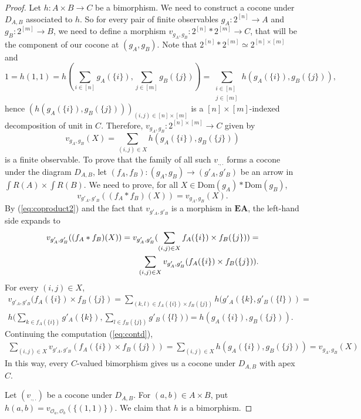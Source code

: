 \documentclass[smallextended]{svjour3}
\begin{document}
\begin{proof}
Let $h:A\times B\to C$ be a bimorphism. 
We need to construct a cocone under $D_{A,B}$ associated to $h$.
So for every pair of finite observables $g_A:2^{[n]}\to A$ and
$g_B:2^{[m]}\to B$, we need to define a morphism $v_{g_A,g_B}:2^{[n]}*2^{[m]}\to C$, that will be
the component of our cocone at $(g_A,g_B)$. Note that $2^{[n]}*2^{[m]}\simeq 2^{[n]\times[m]}$ and
$$
1=h(1,1)=h(\sum_{i\in[n]}g_A(\{i\}),\sum_{j\in[m]}g_B(\{j\}))=
\sum_{\substack{i\in[n]\\j\in[m]}}h(g_A(\{i\}),g_B(\{j\})),
$$
hence $(h(g_A(\{i\}),g_B(\{j\})))_{(i,j)\in[n]\times[m]}$ is a
$[n]\times[m]$-indexed decomposition of unit in $C$.
Therefore, $v_{g_A,g_B}:2^{[n]\times[m]}\to C$ given by
$$
v_{g_A,g_B}(X)=\sum_{(i,j)\in X}h(g_A(\{i\}),g_B(\{j\}))
$$
is a finite observable. To prove that the family of all such $v_{.,.}$ forms a cocone under
the diagram $D_{A,B}$, let $(f_A,f_B):(g_A,g_B)\to (g'_A,g'_B)$ be an arrow in ${\int R({A})}\times{\int R({B})}$.
We need to prove, for all $X\in{\mathrm{Dom}}(g_A)*{\mathrm{Dom}}(g_B)$,
$$v_{g'_A,g'_B}((f_A*f_B)(X))=v_{g_A,g_B}(X).$$
By (\ref{eq:coproduct2}) and the fact that $v_{g'_A,g'_B}$ is a 
morphism in ${\mathbf{EA}}$, the left-hand side expands to
\begin{align}
\notag
v_{g'_A,g'_B}((f_A*f_B)(X))=v_{g'_A,g'_B}(\sum_{(i,j)\in X}f_A(\{i\})\times f_B(\{j\}))=\\
\label{eq:contd}
\sum_{(i,j)\in X}v_{g'_A,g'_B}(f_A(\{i\})\times f_B(\{j\})).
\end{align}
For every $(i,j)\in X$,
\begin{align*}
v_{g'_A,g'_B}(f_A(\{i\})\times f_B(\{j\})=
\sum_{(k,l)\in f_A(\{i\})\times f_B(\{j\})} h(g'_A(\{k\},g'_B(\{l\}))=\\
h\bigl(\sum_{k\in f_A(\{i\})}g'_A(\{k\}),\sum_{l\in f_B(\{j\})}g'_B(\{l\})\bigr)=
h(g_A(\{i\}),g_B(\{j\})).
\end{align*}
Continuing the computation (\ref{eq:contd}),
\begin{align*}
\sum_{(i,j)\in X}v_{g'_A,g'_B}(f_A(\{i\})\times f_B(\{j\}))=
\sum_{(i,j)\in X}h(g_A(\{i\}),g_B(\{j\}))=v_{g_A,g_B}(X)
\end{align*}
In this way, every $C$-valued bimorphism gives us a cocone under $D_{A,B}$ with apex $C$.

Let $(v_{.,.})$ be a cocone under $D_{A,B}$. For $(a,b)\in A\times B$, put $h(a,b)=v_{{\mathcal O_{{a}}},{\mathcal O_{{b}}}}(\{(1,1)\})$.
We claim that $h$ is a bimorphism.


\end{proof}
\end{document}
